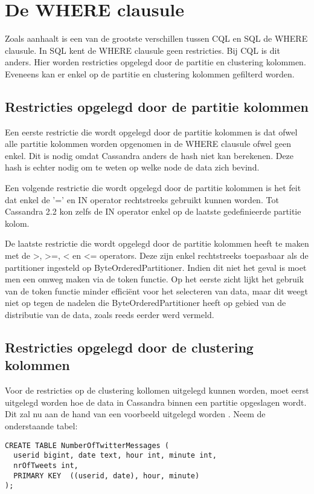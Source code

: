 \section{De WHERE clausule}
Zoals \cite{Lerer2015Where} aanhaalt is een van de grootste verschillen tussen CQL en SQL de WHERE clausule.
In SQL kent de WHERE clausule geen restricties.
Bij CQL is dit anders.
Hier worden restricties opgelegd door de partitie en clustering kolommen.
Eveneens kan er enkel op de partitie en clustering kolommen gefilterd worden.

\subsection{Restricties opgelegd door de partitie kolommen}

Een eerste restrictie die wordt opgelegd door de partitie kolommen is dat ofwel alle partitie kolommen worden opgenomen in de WHERE clausule ofwel geen enkel.
Dit is nodig omdat Cassandra anders de hash niet kan berekenen.
Deze hash is echter nodig om te weten op welke node de data zich bevind.

Een volgende restrictie die wordt opgelegd door de partitie kolommen is het feit dat enkel de '=' en IN operator rechtstreeks gebruikt kunnen worden.
Tot Cassandra 2.2 kon zelfs de IN operator enkel op de laatste gedefinieerde partitie kolom.

De laatste restrictie die wordt opgelegd door de partitie kolommen heeft te maken met de >, >=, < en <= operators.
Deze zijn enkel rechtstreeks toepasbaar als de partitioner ingesteld op ByteOrderedPartitioner.
Indien dit niet het geval is moet men een omweg maken via de token functie.
Op het eerste zicht lijkt het gebruik van de token functie minder efficiënt voor het selecteren van data, maar dit weegt niet op tegen de nadelen die ByteOrderedPartitioner heeft op gebied van de distributie van de data, zoals reeds eerder werd vermeld.

\subsection{Restricties opgelegd door de clustering kolommen}
Voor de restricties op de clustering kollomen uitgelegd kunnen worden, moet eerst uitgelegd worden hoe de data in Cassandra binnen een partitie opgeslagen wordt.
Dit zal nu aan de hand van een voorbeeld uitgelegd worden \citep{Lerer2015Where}.
Neem de onderstaande tabel:

\begin{lstlisting}
CREATE TABLE NumberOfTwitterMessages (
  userid bigint, date text, hour int, minute int,
  nrOfTweets int,
  PRIMARY KEY  ((userid, date), hour, minute)
);
\end{lstlisting}

